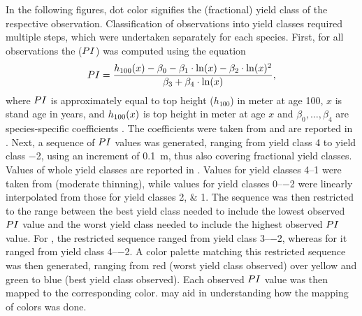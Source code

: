 In the following figures, dot color signifies the (fractional) yield class of the respective observation.  Classification of observations into yield classes required multiple steps, which were undertaken separately for each species.  First, for all observations the \ProductivityIndexText{} (\(PI{}\)) was computed using the equation
\begin{equation}
  \label{eq:NagelFunctionSolvedForProductivityIndex}
  PI{} = \frac{h_{100}{}(x) - \beta_0 - \beta_1 \cdot \ln(x) - \beta_2 \cdot \ln(x)^2 }{\beta_3 + \beta_4 \cdot \ln(x)},
\end{equation}
where \(PI{}\) is approximately equal to top height (\(h_{100}\)) in meter at age \SI{100}{\year}, \(x\) is stand age in years, and \(h_{100}{}(x)\) is top height in meter at age \(x\) and \(\beta_0, \ldots, \beta_4\) are species-specific coefficients \parencite{Nagel1999}.  The coefficients were taken from \textcite{Nagel1999} and are reported in .  Next, a sequence of \(PI{}\) values was generated, ranging from yield class \num{4} to yield class \num{-2}, using an increment of \SI{0.1}{\meter}, thus also covering fractional yield classes.  Values of whole yield classes are reported in .  Values for yield classes \numrange{4}{1} were taken from \textcite{Schober1995} (moderate thinning), while values for yield classes \numrange{0}{-2} were linearly interpolated from those for yield classes \numlist{2;1}.  The sequence was then restricted to the range between the best yield class needed to include the lowest observed \(PI{}\) value and the worst yield class needed to include the highest observed \(PI{}\) value.  For \Beech{}, the restricted sequence ranged from yield class \numrange{3}{-2}, whereas for \Spruce{} it ranged from yield class \numrange{4}{-2}.   A color palette matching this restricted sequence was then generated, ranging from red (worst yield class observed) over yellow and green to blue (best yield class observed).  Each observed \(PI{}\) value was then mapped to the corresponding color.   may aid in understanding how the mapping of colors was done.

